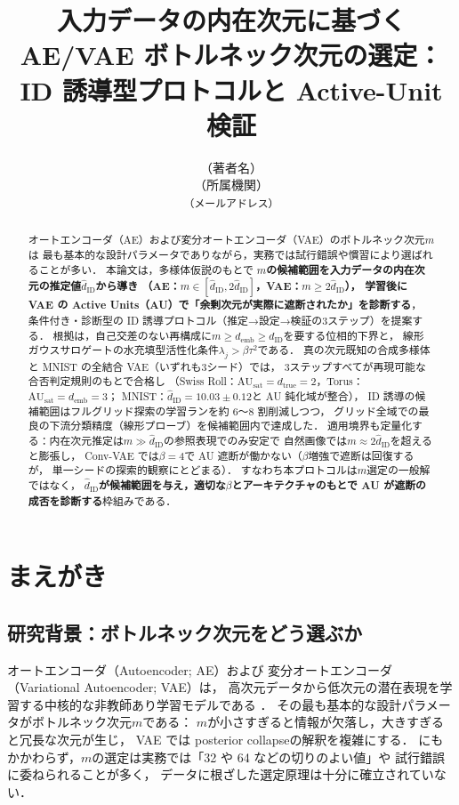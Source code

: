\documentclass[11pt,a4paper]{jsarticle}
\title{入力データの内在次元に基づく AE/VAE ボトルネック次元の選定：\\
ID 誘導型プロトコルと Active-Unit 検証}
\author{（著者名）\\
{\small （所属機関）}\\
{\small \texttt{（メールアドレス）}}}
\date{}
\newcommand{\dID}{d_{\mathrm{ID}}}
\newcommand{\hatdID}{\hat{d}_{\mathrm{ID}}}
\newcommand{\dtrue}{d_{\mathrm{true}}}
\newcommand{\AUsat}{\mathrm{AU}_{\mathrm{sat}}}
\newcommand{\demb}{d_{\mathrm{emb}}}
\begin{document}
\maketitle

\begin{abstract}
オートエンコーダ（AE）および変分オートエンコーダ（VAE）のボトルネック次元$m$は
最も基本的な設計パラメータでありながら，実務では試行錯誤や慣習により選ばれることが多い．
本論文は，多様体仮説のもとで
\textbf{$m$の候補範囲を入力データの内在次元の推定値$\hatdID$から導き
（AE：$m \in [\hatdID, 2\hatdID]$，VAE：$m \geq 2\hatdID$），
学習後に VAE の Active Units（AU）で「余剰次元が実際に遮断されたか」を診断する}，
条件付き・診断型の ID 誘導プロトコル（推定→設定→検証の3ステップ）を提案する．
根拠は，自己交差のない再構成に$m \geq \demb \geq \dID$を要する位相的下界と，
線形ガウスサロゲートの水充填型活性化条件$\lambda_j > \beta\tau^2$である．
真の次元既知の合成多様体と MNIST の全結合 VAE（いずれも3シード）では，
3ステップすべてが再現可能な合否判定規則のもとで合格し
（Swiss Roll：$\AUsat = \dtrue = 2$，Torus：$\AUsat = \demb = 3$；
MNIST：$\hatdID = 10.03 \pm 0.12$と AU 鈍化域が整合），
ID 誘導の候補範囲はフルグリッド探索の学習ランを約 6〜8 割削減しつつ，
グリッド全域での最良の下流分類精度（線形プローブ）を候補範囲内で達成した．
適用境界も定量化する：内在次元推定は$m \gg \hatdID$の参照表現でのみ安定で
自然画像では$m \approx 2\hatdID$を超えると膨張し，
Conv-VAE では$\beta = 4$で AU 遮断が働かない（$\beta$増強で遮断は回復するが，
単一シードの探索的観察にとどまる）．
すなわち本プロトコルは$m$選定の一般解ではなく，
\textbf{$\hatdID$が候補範囲を与え，適切な$\beta$とアーキテクチャのもとで
AU が遮断の成否を診断する}枠組みである．
\end{abstract}

\section{まえがき}\label{sec:intro}

\subsection{研究背景：ボトルネック次元をどう選ぶか}\label{sec:intro_bg}

オートエンコーダ（Autoencoder; AE）および
変分オートエンコーダ（Variational Autoencoder; VAE）\cite{kingma2014vae}は，
高次元データから低次元の潜在表現を学習する中核的な非教師あり学習モデルである
\cite{bengio2013representation}．
その最も基本的な設計パラメータがボトルネック次元$m$である：
$m$が小さすぎると情報が欠落し，大きすぎると冗長な次元が生じ，
VAE では posterior collapse\cite{lucas2019elbo}の解釈を複雑にする．
にもかかわらず，$m$の選定は実務では「32 や 64 などの切りのよい値」や
試行錯誤に委ねられることが多く，
データに根ざした選定原理は十分に確立されていない．
\end{document}
